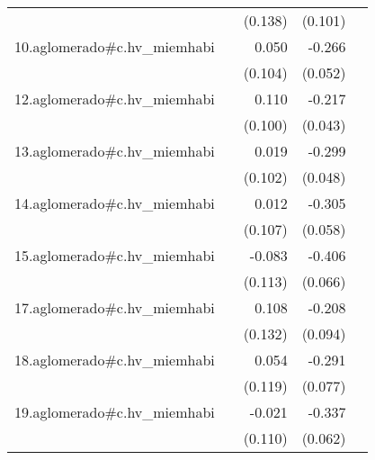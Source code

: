 {\begin{longtable}{l*{4}{D{.}{.}{-1}}}
            &                     &     (0.138)         &     (0.101)         &                     \\
\addlinespace
10.aglomerado#c.hv\_miemhabi&                     &       0.050         &      -0.266\sym{***}&                     \\
            &                     &     (0.104)         &     (0.052)         &                     \\
\addlinespace
12.aglomerado#c.hv\_miemhabi&                     &       0.110         &      -0.217\sym{***}&                     \\
            &                     &     (0.100)         &     (0.043)         &                     \\
\addlinespace
13.aglomerado#c.hv\_miemhabi&                     &       0.019         &      -0.299\sym{***}&                     \\
            &                     &     (0.102)         &     (0.048)         &                     \\
\addlinespace
14.aglomerado#c.hv\_miemhabi&                     &       0.012         &      -0.305\sym{***}&                     \\
            &                     &     (0.107)         &     (0.058)         &                     \\
\addlinespace
15.aglomerado#c.hv\_miemhabi&                     &      -0.083         &      -0.406\sym{***}&                     \\
            &                     &     (0.113)         &     (0.066)         &                     \\
\addlinespace
17.aglomerado#c.hv\_miemhabi&                     &       0.108         &      -0.208\sym{*}  &                     \\
            &                     &     (0.132)         &     (0.094)         &                     \\
\addlinespace
18.aglomerado#c.hv\_miemhabi&                     &       0.054         &      -0.291\sym{***}&                     \\
            &                     &     (0.119)         &     (0.077)         &                     \\
\addlinespace
19.aglomerado#c.hv\_miemhabi&                     &      -0.021         &      -0.337\sym{***}&                     \\
            &                     &     (0.110)         &     (0.062)         &                     \\

\end{longtable}}

